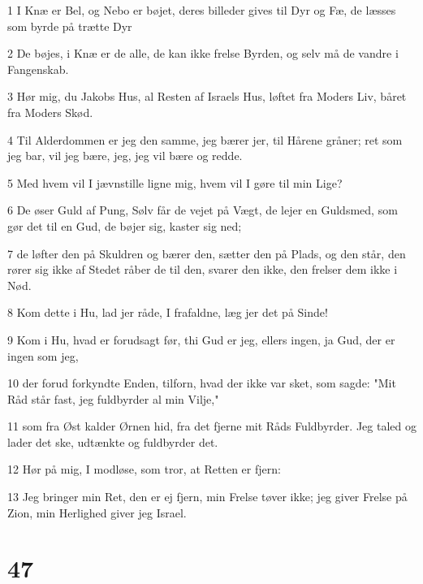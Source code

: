 \par 1 I Knæ er Bel, og Nebo er bøjet, deres billeder gives til Dyr og Fæ, de læsses som byrde på trætte Dyr
\par 2 De bøjes, i Knæ er de alle, de kan ikke frelse Byrden, og selv må de vandre i Fangenskab.
\par 3 Hør mig, du Jakobs Hus, al Resten af Israels Hus, løftet fra Moders Liv, båret fra Moders Skød.
\par 4 Til Alderdommen er jeg den samme, jeg bærer jer, til Hårene gråner; ret som jeg bar, vil jeg bære, jeg, jeg vil bære og redde.
\par 5 Med hvem vil I jævnstille ligne mig, hvem vil I gøre til min Lige?
\par 6 De øser Guld af Pung, Sølv får de vejet på Vægt, de lejer en Guldsmed, som gør det til en Gud, de bøjer sig, kaster sig ned;
\par 7 de løfter den på Skuldren og bærer den, sætter den på Plads, og den står, den rører sig ikke af Stedet råber de til den, svarer den ikke, den frelser dem ikke i Nød.
\par 8 Kom dette i Hu, lad jer råde, I frafaldne, læg jer det på Sinde!
\par 9 Kom i Hu, hvad er forudsagt før, thi Gud er jeg, ellers ingen, ja Gud, der er ingen som jeg,
\par 10 der forud forkyndte Enden, tilforn, hvad der ikke var sket, som sagde: "Mit Råd står fast, jeg fuldbyrder al min Vilje,"
\par 11 som fra Øst kalder Ørnen hid, fra det fjerne mit Råds Fuldbyrder. Jeg taled og lader det ske, udtænkte og fuldbyrder det.
\par 12 Hør på mig, I modløse, som tror, at Retten er fjern:
\par 13 Jeg bringer min Ret, den er ej fjern, min Frelse tøver ikke; jeg giver Frelse på Zion, min Herlighed giver jeg Israel.

\chapter{47}

